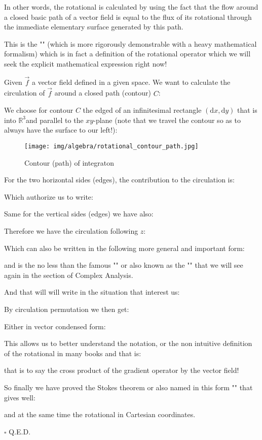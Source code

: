 	\begin{theorem}
	In other words, the rotational is calculated by using the fact that the flow around a closed basic path of a vector field is equal to the flux of its rotational through the immediate elementary surface generated by this path.

	This is the "\label{stokes theorem}" (which is more rigorously demonstrable with a heavy mathematical formalism) which is in fact a definition of the rotational operator which we will seek the explicit mathematical expression right now!
	\end{theorem}
	\begin{dem}
	Given $\vec{f}$ a vector field defined in a given space. We want to calculate the circulation of $\vec{f}$ around a closed path (contour) $C$:
	
	We choose for contour $C$ the edged of an infinitesimal rectangle $(\mathrm{d}x,\mathrm{d}y)$ that is into $\mathbb{R}^3$and parallel to the $xy$-plane (note that we travel the contour so as to always have the surface to our left!):
	\begin{figure}[H]
		\centering
		\texttt{[image: img/algebra/rotational\_contour\_path.jpg]}
		\caption[]{Contour (path) of integraton}
	\end{figure}
	For the two horizontal sides (edges), the contribution to the circulation is:
	
	Which authorize us to write:
	
	Same for the vertical sides  (edges) we have also:
	
	Therefore we have the circulation following $z$:
	
	Which can also be written in the following more general and important form:
	
	and is the no less than the famous "\label{green theorem}" or also known as the "" that we will see again in the section of Complex Analysis.
	
	And that will will write in the situation that interest us:
	
	By circulation permutation we then get:
	
	Either in vector condensed form:
	
	This allows us to better understand the notation, or the non intuitive definition of the rotational in many books and that is:
	
	that is to say the cross product of the gradient operator by the vector field!
	
	So finally we have proved the Stokes theorem or also named in this form "" that gives well:
	
	and at the same time the rotational in Cartesian coordinates.
	\begin{flushright}
		$\square$  Q.E.D.
	\end{flushright}
	\end{dem}
